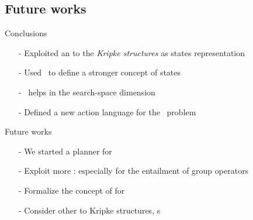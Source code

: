 
\subsection*{Future works}
\begin{frame}{Conclusions}
	\begin{itemize}
		\item[-] Exploited an  to  the \emph{Kripke structures} as states representation
		\item[-] Used \emph{\posS}\ to define a stronger concept of states 
		\item[-] \PosS\ helps in   the search-space dimension
		\item[-] Defined a new action language for the \mep\ problem
	\end{itemize}
\end{frame}

\begin{frame}{Future works}

	\begin{itemize}
		\item[-] We started  a planner for \ourL\vspace{0.5cm}
		\itemsep0.3cm
		\item[-] Exploit more : especially for the entailment of group operators
		\item[-] Formalize the concept of  for \ourL
		\item[-] Consider other  to Kripke structures, \eg {}s
	\end{itemize}
\end{frame}


